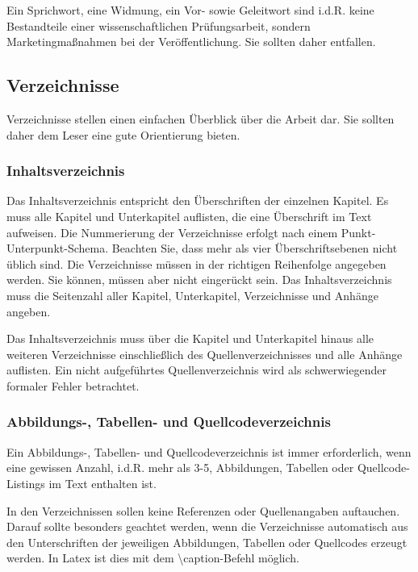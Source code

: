 Ein Sprichwort, eine Widmung, ein Vor- sowie Geleitwort sind i.d.R. keine Bestandteile einer wissenschaftlichen Prüfungsarbeit, sondern Marketingmaßnahmen bei der Veröffentlichung. Sie sollten daher entfallen.

\subsection{Verzeichnisse}\label{sec:structure:tables}
%
Verzeichnisse stellen einen einfachen Überblick über die Arbeit dar. Sie sollten daher dem Leser eine gute Orientierung bieten.

\subsubsection{Inhaltsverzeichnis}\label{sec:structure:tables:toc}
%
Das Inhaltsverzeichnis entspricht den Überschriften der einzelnen Kapitel. Es muss alle Kapitel und Unterkapitel auflisten, die eine Überschrift im Text aufweisen. Die Nummerierung der Verzeichnisse erfolgt nach einem Punkt-Unterpunkt-Schema. Beachten Sie, dass mehr als vier Überschriftsebenen nicht üblich sind. Die Verzeichnisse müssen in der richtigen Reihenfolge angegeben werden. Sie können, müssen aber nicht eingerückt sein. Das Inhaltsverzeichnis muss die Seitenzahl aller Kapitel, Unterkapitel, Verzeichnisse und Anhänge angeben.

Das Inhaltsverzeichnis muss über die Kapitel und Unterkapitel hinaus alle weiteren Verzeichnisse einschließlich des Quellenverzeichnisses und alle Anhänge auflisten. Ein nicht aufgeführtes Quellenverzeichnis wird als schwerwiegender formaler Fehler betrachtet.

\subsubsection{Abbildungs-, Tabellen- und Quellcodeverzeichnis}\label{sec:structure:tables:misc}
%
Ein Abbildungs-, Tabellen- und Quellcodeverzeichnis ist immer erforderlich, wenn eine gewissen Anzahl, i.d.R. mehr als 3-5, Abbildungen, Tabellen oder  Quellcode-Listings im Text enthalten ist.

In den Verzeichnissen sollen keine Referenzen oder Quellenangaben auftauchen. Darauf sollte besonders geachtet werden, wenn die Verzeichnisse automatisch aus den Unterschriften der jeweiligen Abbildungen, Tabellen oder Quellcodes erzeugt werden. In Latex ist dies mit dem \textbackslash caption-Befehl möglich.
\medskip

